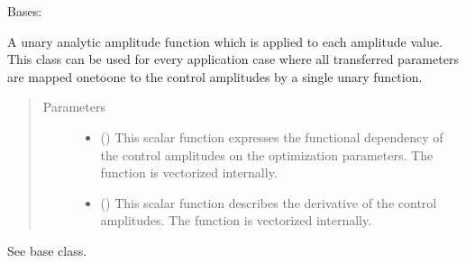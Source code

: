 \documentclass[letterpaper,10pt,english]{sphinxmanual}
\begin{document}
\begin{fulllineitems}
\label{\detokenize{qsim:qsim.amplitude_functions.UnaryAnalyticAmpFunc}}
Bases: {\hyperref[\detokenize{qsim:qsim.amplitude_functions.AmplitudeFunction}]{}}

A unary analytic amplitude function which is applied to each amplitude
value. This class can be used for every application case where all
transferred parameters are mapped one\sphinxhyphen{}to\sphinxhyphen{}one to the control amplitudes
by a single unary function.
\begin{quote}\begin{description}
\item[{Parameters}] \leavevmode\begin{itemize}
\item {} 
 () \textendash{} This scalar function expresses the functional dependency of the control
amplitudes on the optimization parameters. The function is vectorized
internally.

\item {} 
 () \textendash{} This scalar function describes the derivative of the control
amplitudes. The function is vectorized internally.

\end{itemize}

\end{description}\end{quote}

\begin{fulllineitems}
\label{\detokenize{qsim:qsim.amplitude_functions.UnaryAnalyticAmpFunc.derivative_by_chain_rule}}
See base class.

\end{fulllineitems}


\end{fulllineitems}
\end{document}
